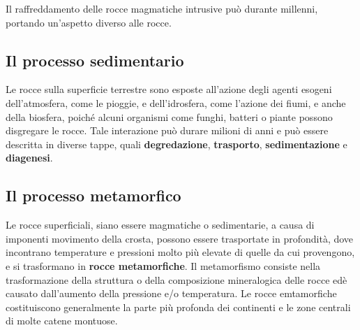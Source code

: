 \documentclass[a4paper]{article}
\begin{document}
Il raffreddamento delle rocce magmatiche intrusive può durante millenni,
portando un'aspetto diverso alle rocce.


\pagebreak

\subsection{Il processo sedimentario}

Le rocce sulla superficie terrestre sono esposte all'azione degli agenti esogeni
dell'atmosfera, come le pioggie, e dell'idrosfera, come l'azione dei fiumi,
e anche della biosfera, poiché alcuni organismi come funghi, batteri o piante possono disgregare le rocce.
Tale interazione può durare milioni di anni e può essere descritta in diverse tappe,
quali \textbf{degredazione}, \textbf{trasporto}, \textbf{sedimentazione} e \textbf{diagenesi}.


\subsection{Il processo metamorfico}

Le rocce superficiali, siano essere magmatiche o sedimentarie, a causa di imponenti
movimento della crosta, possono essere trasportate in profondità, dove incontrano
temperature e pressioni molto più elevate di quelle da cui provengono, e si
trasformano in \textbf{rocce metamorfiche}.
Il metamorfismo consiste nella trasformazione della struttura
o della composizione mineralogica delle rocce edè causato dall'aumento della pressione e/o temperatura.
Le rocce emtamorfiche costituiscono generalmente la parte più profonda dei continenti e le zone centrali
di molte catene montuose.


\end{document}
